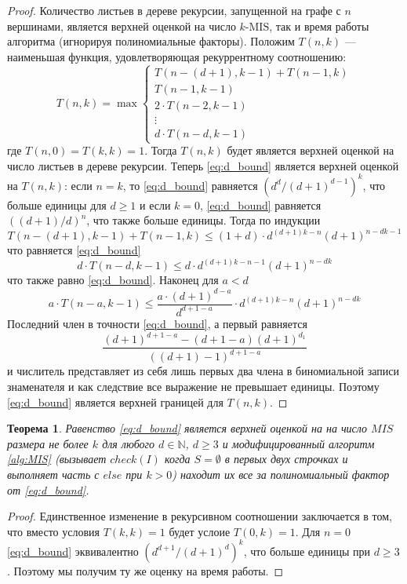 \documentclass[12pt]{article}
\newtheorem{theorem}{Теорема}
\begin{document}
\begin{proof}
Количество листьев в дереве рекурсии, запущенной на графе с $n$ вершинами, является верхней оценкой на число $k$-$\text{MIS}$, так и время работы алгоритма (игнорируя по\-ли\-но\-ми\-аль\-ные факторы). Положим $T\left(n, k\right)$ --- наименьшая функция, удовлетворяющая рекуррентному соотношению:
\begin{equation}\label{eq:T(n,k)}
    T\left(n, k\right) = \max \begin{cases}
        T\left(n - \left(d+1\right), k - 1\right) + T\left(n - 1, k\right)
        \\
        T\left(n - 1, k - 1\right)
        \\
        2 \cdot T\left(n - 2, k - 1\right)
        \\
        \vdots
        \\
        d \cdot T\left(n - d, k - 1\right)
    \end{cases}  
\end{equation}
где $T\left(n, 0\right) = T\left(k, k\right) = 1$. Тогда $T\left(n, k\right)$ будет является верхней оценкой на число листьев в дереве рекурсии. Теперь \eqref{eq:d_bound} является верхней оценкой на $T\left(n, k\right)$: если $n = k$, то \ref{eq:d_bound} ра\-вня\-ет\-ся $\left(d^d/\left(d + 1\right)^{d - 1}\right)^k$, что больше единицы для $d \geq 1$ и если $k = 0$, \ref{eq:d_bound} равняется $\left(\left(d + 1\right)/d\right)^n$, что также больше единицы. Тогда по индукции
$$T\left(n - \left(d+1\right), k - 1\right) + T\left(n - 1, k\right) \leq \left(1 + d\right)\cdot d^{\left(d + 1\right)k - n}\left(d + 1\right)^{n - dk - 1}$$
что равняется \eqref{eq:d_bound}
$$ d \cdot T\left(n - d, k - 1\right) \leq d \cdot d^{\left(d + 1\right)k - n - 1}\left(d+1\right)^{n - dk} $$
что также равно \eqref{eq:d_bound}. Наконец для $a < d$
$$a \cdot T\left(n - a, k - 1\right) \leq \frac{a \cdot \left(d + 1\right)^{d - a}}{d^{d + 1 - a}} \cdot d^{\left(d + 1\right)k - n}\left(d+1\right)^{n - dk}$$
Последний член в точности \eqref{eq:d_bound}, а первый равняется
$$ \frac{\left(d + 1\right)^{d + 1 - a}-\left(d + 1 - a\right)\left(d + 1\right)^{d _ 1}}{\left(\left(d + 1\right) - 1\right)^{d + 1 - a}} $$
и числитель представляет из себя лишь первых два члена в биномиальной записи знаменателя и как следствие все выражение не превышает единицы. Поэтому \eqref{eq:d_bound} яв\-ля\-ет\-ся верхней границей для $T\left(n, k\right)$.
\end{proof}
\begin{theorem}\label{th:time}
Равенство \eqref{eq:d_bound} является верхней оценкой на на число $MIS$ размера не более $k$ для любого $d \in \mathbb{N}$, $d \geq 3$ и модифицированный алгоритм \ref{alg:MIS} (вызывает $check\left(I\right)$ когда $S = \emptyset$ в первых двух строчках и выполняет часть с $else$ при $k > 0$) находит их все за полиномиальный фактор от \eqref{eq:d_bound}.
\end{theorem}
\begin{proof}
Единственное изменение в рекурсивном соотношении заключается в том, что вместо условия $T\left(k, k\right) = 1$ будет услоие $T\left(0, k\right) = 1$. Для $n = 0$ \eqref{eq:d_bound} эквивалентно $\left(d^{d + 1}/\left(d + 1\right)^d\right)^k$, что больше единицы при $d \geq 3$. Поэтому мы получим ту же оценку на время работы.
\end{proof}
\end{document}
